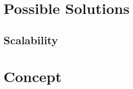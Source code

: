 %
%
\section{Possible Solutions} \label{chapt:solutions}

\subsection{Scalability} \label{chapt:mission:scalability}

%
%
\section{Concept} \label{chapt:mission:concept}